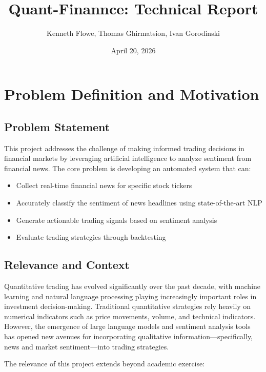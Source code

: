 \documentclass[12pt]{article}
\title{Quant-Finannce: Technical Report}
\author{Kenneth Flowe, Thomas Ghirmatsion, Ivan Gorodinski}
\date{April 20, 2026}
\begin{document}
\maketitle
\thispagestyle{empty}

\section{Problem Definition and Motivation}

\subsection{Problem Statement}

This project addresses the challenge of making informed trading decisions in financial markets by leveraging artificial intelligence to analyze sentiment from financial news. The core problem is developing an automated system that can:

\begin{itemize}
\item Collect real-time financial news for specific stock tickers
\item Accurately classify the sentiment of news headlines using state-of-the-art NLP
\item Generate actionable trading signals based on sentiment analysis
\item Evaluate trading strategies through backtesting
\end{itemize}

\subsection{Relevance and Context}

Quantitative trading has evolved significantly over the past decade, with machine learning and natural language processing playing increasingly important roles in investment decision-making. Traditional quantitative strategies rely heavily on numerical indicators such as price movements, volume, and technical indicators. However, the emergence of large language models and sentiment analysis tools has opened new avenues for incorporating qualitative information—specifically, news and market sentiment—into trading strategies.

The relevance of this project extends beyond academic exercise:
\end{document}
